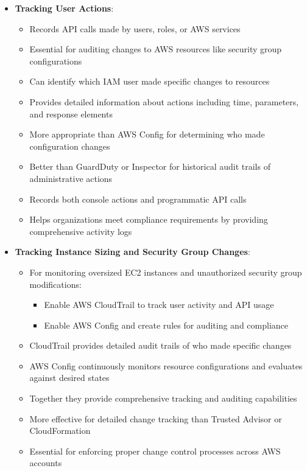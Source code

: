 \documentclass[11pt,a4paper]{report}
\begin{document}
\begin{itemize}
  \item \textbf{Tracking User Actions}:
\begin{itemize}
  \item Records API calls made by users, roles, or AWS services
  \item Essential for auditing changes to AWS resources like security group configurations
  \item Can identify which IAM user made specific changes to resources
  \item Provides detailed information about actions including time, parameters, and response elements
  \item More appropriate than AWS Config for determining who made configuration changes
  \item Better than GuardDuty or Inspector for historical audit trails of administrative actions
  \item Records both console actions and programmatic API calls
  \item Helps organizations meet compliance requirements by providing comprehensive activity logs
\end{itemize}
  \item \textbf{Tracking Instance Sizing and Security Group Changes}:
\begin{itemize}
  \item For monitoring oversized EC2 instances and unauthorized security group modifications:
\begin{itemize}
  \item Enable AWS CloudTrail to track user activity and API usage
  \item Enable AWS Config and create rules for auditing and compliance
\end{itemize}
  \item CloudTrail provides detailed audit trails of who made specific changes
  \item AWS Config continuously monitors resource configurations and evaluates against desired states
  \item Together they provide comprehensive tracking and auditing capabilities
  \item More effective for detailed change tracking than Trusted Advisor or CloudFormation
  \item Essential for enforcing proper change control processes across AWS accounts
\end{itemize}
\end{itemize}
\end{document}

